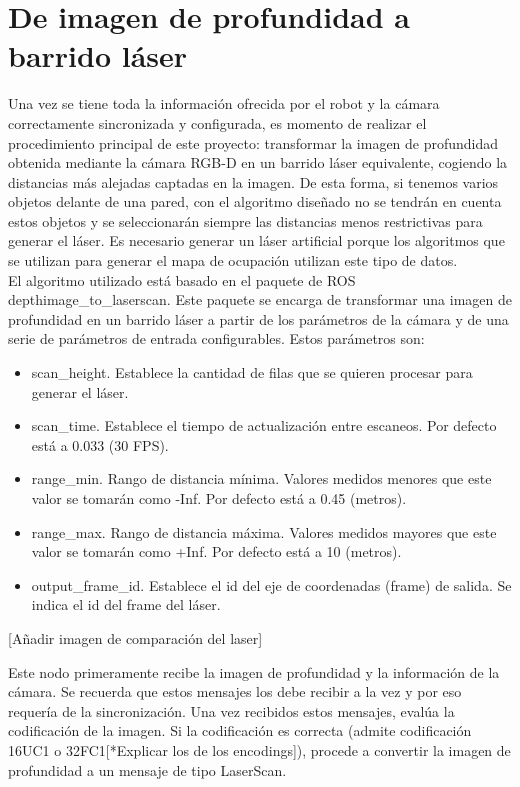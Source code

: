 \section{De imagen de profundidad a barrido láser}

Una vez se tiene toda la información ofrecida por el robot y la cámara correctamente sincronizada y configurada, es momento de realizar el procedimiento principal de este proyecto: transformar la imagen de profundidad obtenida mediante la cámara RGB-D en un barrido láser equivalente, cogiendo la distancias más alejadas captadas en la imagen. De esta forma, si tenemos varios objetos delante de una pared, con el algoritmo diseñado no se tendrán en cuenta estos objetos y se seleccionarán siempre las distancias menos restrictivas para generar el láser. Es necesario generar un láser artificial porque los algoritmos que se utilizan para generar el mapa de ocupación utilizan este tipo de datos.\\

El algoritmo utilizado está basado en el paquete de ROS depthimage\_to\_laserscan. Este paquete se encarga de transformar una imagen de profundidad en un barrido láser a partir de los parámetros de la cámara y de una serie de parámetros de entrada configurables. Estos parámetros son:

\begin{itemize}

	\item scan\_height. Establece la cantidad de filas que se quieren procesar para generar el láser. 
	\item scan\_time. Establece el tiempo de actualización entre escaneos. Por defecto está a 0.033 (30 FPS).
	\item range\_min. Rango de distancia mínima. Valores medidos menores que este valor se tomarán como -Inf. Por defecto está a 0.45 (metros).
	\item range\_max. Rango de distancia máxima. Valores medidos mayores que este valor se tomarán como +Inf. Por defecto está a 10 (metros).
	\item output\_frame\_id. Establece el id del eje de coordenadas (frame) de salida. Se indica el id del frame del láser.

\end{itemize}

[Añadir imagen de comparación del laser]

Este nodo primeramente recibe la imagen de profundidad y la información de la cámara. Se recuerda que estos mensajes los debe recibir a la vez y por eso requería de la sincronización. Una vez recibidos estos mensajes, evalúa la codificación de la imagen. Si la codificación es correcta (admite codificación 16UC1 o 32FC1[*Explicar los de los encodings]), procede a convertir la imagen de profundidad a un mensaje de tipo LaserScan.\\

